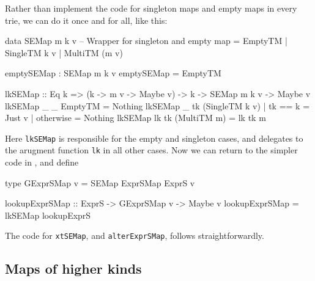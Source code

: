 \documentclass[acmsmall]{acmart}
\theoremstyle{theorem}
\theoremstyle{definition}
\theoremstyle{remark}
\begin{document}
Rather than implement the code for singleton maps and empty maps in every trie,
we can do it once and for all, like this:
\begin{code}
data SEMap m k v  -- Wrapper for singleton and empty map
  = EmptyTM | SingleTM k v | MultiTM (m v)

emptySEMap : SEMap m k v
emptySEMap = EmptyTM

lkSEMap :: Eq k => (k -> m v -> Maybe v) -> k -> SEMap m k v -> Maybe v
lkSEMap _  _  EmptyTM                    = Nothing
lkSEMap _  tk (SingleTM k v) | tk == k   = Just v
                             | otherwise = Nothing
lkSEMap lk tk (MultiTM m)                = lk tk m
\end{code}
Here \lstinline{lkSEMap} is responsible for the empty and singleton
cases, and delegates to the arugment function \lstinline{lk} in all other cases.
Now we can return to the simpler code in , and define
\begin{code}
type GExprSMap v = SEMap ExprSMap ExprS v

lookupExprSMap :: ExprS -> GExprSMap v -> Maybe v
lookupExprSMap = lkSEMap lookupExprS
\end{code}
The code for \lstinline{xtSEMap}, and \lstinline{alterExprSMap}, follows straightforwardly.

\subsection{Maps of higher kinds}
\end{document}
